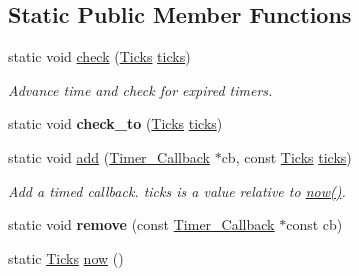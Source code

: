 \subsection*{Static Public Member Functions}
\begin{DoxyCompactItemize}
\item 
\hypertarget{classGUI_1_1Timer_aca48b51e64a4b4e4fdcc83f0edb06f0a}{static void \hyperlink{classGUI_1_1Timer_aca48b51e64a4b4e4fdcc83f0edb06f0a}{check} (\hyperlink{namespaceGUI_af396fee5d5c26b98218f5803f85e3b65}{Ticks} \hyperlink{classGUI_1_1Timer_a619f8c17a217a4524de5ba0e2562870e}{ticks})}\label{classGUI_1_1Timer_aca48b51e64a4b4e4fdcc83f0edb06f0a}

\begin{DoxyCompactList}\small\item\em Advance time and check for expired timers. \end{DoxyCompactList}\item 
\hypertarget{classGUI_1_1Timer_a2616b1e281ffe597d0f542f990a696d6}{static void {\bfseries check\-\_\-to} (\hyperlink{namespaceGUI_af396fee5d5c26b98218f5803f85e3b65}{Ticks} \hyperlink{classGUI_1_1Timer_a619f8c17a217a4524de5ba0e2562870e}{ticks})}\label{classGUI_1_1Timer_a2616b1e281ffe597d0f542f990a696d6}

\item 
static void \hyperlink{classGUI_1_1Timer_a98c2196c1df33283c26777acf9aeffee}{add} (\hyperlink{structGUI_1_1Timer__Callback}{Timer\-\_\-\-Callback} $\ast$cb, const \hyperlink{namespaceGUI_af396fee5d5c26b98218f5803f85e3b65}{Ticks} \hyperlink{classGUI_1_1Timer_a619f8c17a217a4524de5ba0e2562870e}{ticks})
\begin{DoxyCompactList}\small\item\em Add a timed callback. {\ttfamily ticks} is a value relative to \hyperlink{classGUI_1_1Timer_aeaf90bbc6251a55bb4f8c839813592bf}{now()}. \end{DoxyCompactList}\item 
\hypertarget{classGUI_1_1Timer_a6897be47e69947908ca681bcc04c949d}{static void {\bfseries remove} (const \hyperlink{structGUI_1_1Timer__Callback}{Timer\-\_\-\-Callback} $\ast$const cb)}\label{classGUI_1_1Timer_a6897be47e69947908ca681bcc04c949d}

\item 
\hypertarget{classGUI_1_1Timer_aeaf90bbc6251a55bb4f8c839813592bf}{static \hyperlink{namespaceGUI_af396fee5d5c26b98218f5803f85e3b65}{Ticks} \hyperlink{classGUI_1_1Timer_aeaf90bbc6251a55bb4f8c839813592bf}{now} ()}\label{classGUI_1_1Timer_aeaf90bbc6251a55bb4f8c839813592bf}


\end{DoxyCompactItemize}
